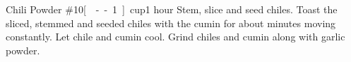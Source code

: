\begin{recipe}{Chili Powder \#10}{\unit[--1]{cup}}{1 hour}
Stem, slice and seed chiles.
Toast the sliced, stemmed and seeded chiles with the cumin for about \unit[3--4]{minutes} moving constantly.  Let chile and cumin cool.
Grind chiles and cumin along with garlic powder.
\end{recipe}
